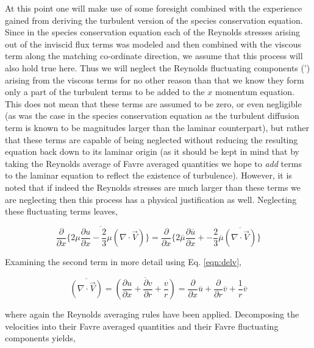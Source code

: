 	At this point one will make use of some foresight combined with the experience gained from deriving
the turbulent version of the species conservation equation.  Since in the species conservation equation each
of the Reynolds stresses arising out of the inviscid flux terms was modeled and then combined with the viscous
term along the matching co-ordinate direction, we assume that this process will also hold true here.  Thus 
we will neglect the Reynolds fluctuating components (') arising from the viscous terms for no other reason than that 
we know they form only a part of the turbulent terms to be added to the $x$ momentum equation.  This does not mean 
that these terms are
assumed to be zero, or even negligible (as was the case in the species conservation equation as the turbulent
diffusion term is known to be magnitudes larger than the laminar counterpart), but rather that these terms are 
capable of being neglected without reducing the resulting equation back down to its laminar origin (as it should
be kept in mind that by taking the Reynolds average of Favre averaged quantities we hope to \emph{add} terms to the 
laminar equation to reflect the existence of turbulence).  However, it is noted that if indeed the Reynolds stresses
are much larger than these terms we are neglecting then this process has a physical justification as well.  
Neglecting these fluctuating terms leaves,

\begin{displaymath}
	\overline{\frac{\partial}{\partial x}\Big\{
	2\mu \frac{\partial u}{\partial x} - \frac{2}{3}\mu (\nabla \cdot \vec{V})} \Big\} = \frac{\partial}{\partial x}\Big\{
	2 \overline{\mu} \frac{\partial \overline{u}}{\partial x} + 
	- \frac{2}{3}\overline{\mu} \overline{(\nabla \cdot \vec{V})} \Big\}
\end{displaymath}

	Examining the second term in more detail using Eq. \ref{eqn:delv},

\begin{displaymath}
	\overline{(\nabla \cdot \vec{V})} = \overline{(\frac{\partial u}{\partial x} +  \frac{\partial v}{\partial r} 
	+ \frac{v}{r} )} = \frac{\partial}{\partial x}\overline{u} + \frac{\partial}{\partial r}\overline{v} +
	\frac{1}{r}\overline{v}
\end{displaymath}
	
	where again the Reynolds averaging rules have been applied.  Decomposing the velocities into their Favre
averaged quantities and their Favre fluctuating components yields,

